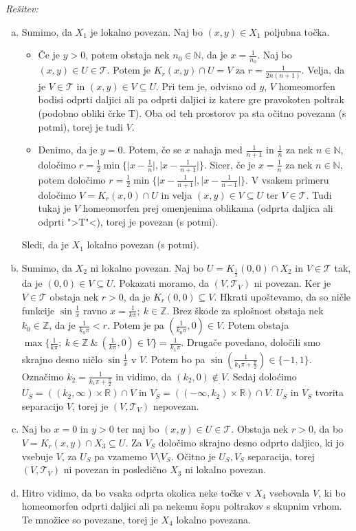 \documentclass[a4paper, 10pt]{article}
\newenvironment{resitev}{\begin{flushleft}\textit{Rešitev:}}{\hfill\end{flushleft}}
\newcommand{\abs}[1]{\ensuremath{\lvert #1 \rvert}}
\newcommand{\mth}[1]{\ensuremath{\mathbb{#1}}}
\newcommand{\R}{\mth{R}}
\newcommand{\Z}{\mth{Z}}
\newcommand{\N}{\mth{N}}
\begin{document}
	\begin{resitev}
		\begin{enumerate}[a)]
			\item Sumimo, da $X_1$ je lokalno povezan. Naj bo $(x, y)\in X_1$ poljubna točka. \begin{itemize}
			\item Če je $y> 0$, potem obstaja nek $n_0 \in \N$, da je $x = \frac{1}{n_0}$. Naj bo $(x, y)\in U\in \mathcal{T}$. Potem je $K_r(x, y)\cap U = V$ za $r = \frac{1}{2n(n+1)}$. Velja, da je $V\in \mathcal{T}$ in $(x, y)\in V\subseteq U$. Pri tem je, odvisno od $y$, $V$ homeomorfen bodisi odprti daljici ali pa odprti daljici iz katere gre pravokoten poltrak (podobno obliki črke T). Oba od teh prostorov pa sta očitno povezana (s potmi), torej je tudi $V$.
			\item  Denimo, da je $y = 0$. Potem, če se $x$ nahaja med $\frac{1}{n+1}$ in $\frac{1}{n}$ za nek $n\in\N$, določimo $r = \frac{1}{2}\min\{\abs{x - \frac{1}{n}}, \abs{x - \frac{1}{n+1}}\}$. Sicer, če je $x = \frac{1}{n}$ za nek $n\in \N$, potem določimo $r = \frac{1}{2}\min\{\abs{x - \frac{1}{n+1}}, \abs{x - \frac{1}{n-1}}\}$. V vsakem primeru določimo $V = K_r(x, 0)\cap U$ in velja $(x, y)\in V\subseteq U$ ter $V\in \mathcal{T}$. Tudi tukaj je $V$ homeomorfen prej omenjenima oblikama (odprta daljica ali odprti ">T"<), torej je povezan (s potmi).
				\end{itemize}
			Sledi, da je $X_1$ lokalno povezan (s potmi).
			\item Sumimo, da $X_2$ ni lokalno povezan. Naj bo $U = K_{\frac{1}{2}}(0, 0)\cap X_2$ in $V\in \mathcal{T}$ tak, da je $(0, 0)\in V \subseteq U$. Pokazati moramo, da $(V, \mathcal{T}_V)$ ni povezan. Ker je $V\in \mathcal{T}$ obstaja nek $r> 0$, da je $K_r(0, 0)\subseteq V$. Hkrati upoštevamo, da so ničle funkcije $\sin\frac{1}{x}$ ravno $x = \frac{1}{k\pi};~k\in\Z$. Brez škode za splošnost obstaja nek $k_0\in\Z$, da je $\frac{1}{k_0\pi} < r$. Potem je pa $(\frac{1}{k_0\pi}, 0)\in V$. Potem obstaja $\max\{\frac{1}{k\pi};~ k\in\Z~\&~(\frac{1}{k\pi}, 0)\in V\} = \frac{1}{k_1\pi}$. Drugače povedano, določili smo skrajno desno ničlo $\sin\frac{1}{x}$ v $V$. Potem bo pa $\sin(\frac{1}{k_1\pi + \frac{\pi}{2}})\in \{-1, 1\}$. Označimo $k_2 = \frac{1}{k_1\pi + \frac{\pi}{2}}$ in vidimo, da $(k_2, 0)\notin V$. Sedaj doloćimo $U_S = ((k_2, \infty)\times\R)\cap V$ in $V_S = ((-\infty, k_2)\times\R)\cap V$. $U_S$ in $V_S$ tvorita separacijo $V$, torej je $(V, \mathcal{T}_V)$ nepovezan.
			\item Naj bo $x = 0$ in $y>0$ ter naj bo $(x, y)\in U\in \mathcal{T}$. Obstaja nek $r> 0$, da bo $V = K_r(x, y)\cap X_3 \subseteq U$. Za $V_S$ določimo skrajno desno odprto daljico, ki jo vsebuje $V$, za $U_S$ pa vzamemo $V\setminus V_S$. Očitno je $U_S, V_S$ separacija, torej $(V, \mathcal{T}_V)$ ni povezan in posledično $X_3$ ni lokalno povezan.
			\item Hitro vidimo, da bo vsaka odprta okolica neke točke v $X_4$ vsebovala $V$, ki bo homeomorfen odprti daljici ali pa nekemu šopu poltrakov s skupnim vrhom. Te množice so povezane, torej je $X_4$ lokalno povezana.
		\end{enumerate}
	\end{resitev}
\end{document}
